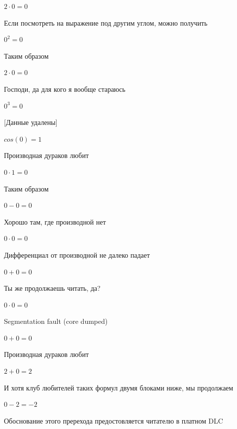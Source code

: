 \documentclass[12pt,a4paper,fleqn]{article}
\begin{document}
\begin{center}$2 \cdot 0 = 0$\end{center}
Если посмотреть на выражение под другим углом, можно получить

\begin{center}$0^{2} = 0$\end{center}
Таким образом

\begin{center}$2 \cdot 0 = 0$\end{center}
Господи, да для кого я вообще стараюсь

\begin{center}$0^{3} = 0$\end{center}
[Данные удалены]

\begin{center}$cos(0) = 1$\end{center}
Производная дураков любит\cite{link2}

\begin{center}$0 \cdot 1 = 0$\end{center}
Таким образом

\begin{center}$0-0 = 0$\end{center}
Хорошо там, где производной нет\cite{link2}

\begin{center}$0 \cdot 0 = 0$\end{center}
Дифференциал от производной не далеко падает\cite{link2}

\begin{center}$0+0 = 0$\end{center}
Ты же продолжаешь читать, да?

\begin{center}$0 \cdot 0 = 0$\end{center}
Segmentation fault (core dumped)

\begin{center}$0+0 = 0$\end{center}
Производная дураков любит\cite{link2}

\begin{center}$2+0 = 2$\end{center}
И хотя клуб любителей таких формул двумя блоками ниже, мы продолжаем

\begin{center}$0-2 = -2$\end{center}
Обоснование этого пререхода предостовляется читателю в платном DLC
\end{document}
